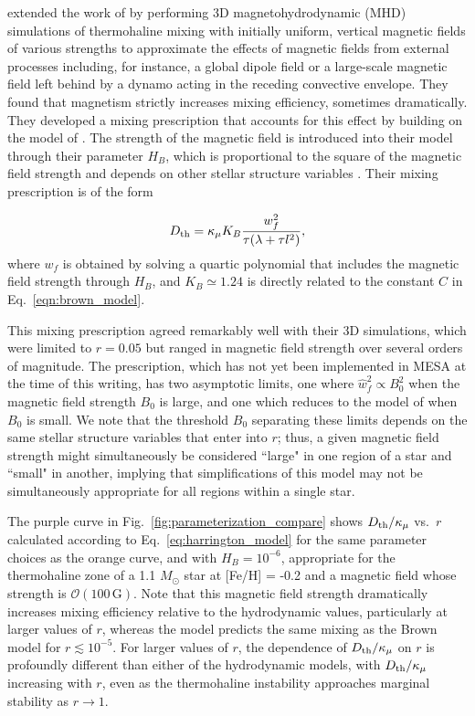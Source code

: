 \citet{harrington} extended the work of \citet{brown_etal_2013} by performing 3D magnetohydrodynamic (MHD) simulations of thermohaline mixing with initially uniform, vertical magnetic fields of various strengths to approximate the effects of magnetic fields from external processes including, for instance, a global dipole field or a large-scale magnetic field left behind by a dynamo acting in the receding convective envelope. 
They found that magnetism strictly increases mixing efficiency, sometimes dramatically.
They developed a mixing prescription that accounts for this effect by building on the model of \citet{brown_etal_2013}.
The strength of the magnetic field is introduced into their model through their parameter $H_B$, which is proportional to the square of the magnetic field strength and depends on other stellar structure variables \citep[see Eq.~19 of][]{harrington}.
Their mixing prescription is of the form

\begin{equation} \label{eq:harrington_model}
    \Dth = \kappa_{\mu}K_B\frac{w_f^2}{\tau (\lambda + \tau l^2)},
\end{equation}
where $w_f$ is obtained by solving a quartic polynomial that includes the magnetic field strength through $H_B$, and $K_B \simeq 1.24$ is directly related to the constant $C$ in Eq.~\eqref{eqn:brown_model}.

This mixing prescription agreed remarkably well with their 3D simulations, which were limited to $r = 0.05$ but ranged in magnetic field strength over several orders of magnitude.
The prescription, which has not yet been implemented in MESA at the time of this writing, has two asymptotic limits, one where $\hat{w}_f^2 \propto B_0^2$ when the magnetic field strength $B_0$ is large, and one which reduces to the model of \citet{brown_etal_2013} when $B_0$ is small. 
We note that the threshold $B_0$ separating these limits depends on the same stellar structure variables that enter into $r$; thus, a given magnetic field strength might simultaneously be considered ``large" in one region of a star and ``small" in another, implying that simplifications of this model may not be simultaneously appropriate for all regions within a single star.

The purple curve in Fig.~\ref{fig:parameterization_compare} shows $D_\mathrm{th}/\kappa_\mu$ vs.~$r$ calculated according to Eq.~\eqref{eq:harrington_model} for the same parameter choices as the orange curve, and with $H_B = 10^{-6}$, appropriate for the thermohaline zone of a 1.1 $M_\odot$ star at [Fe/H] = -0.2 and a magnetic field whose strength is $\mathcal{O}(100 \,\mathrm{G})$. 
Note that this magnetic field strength dramatically increases mixing efficiency relative to the hydrodynamic values, particularly at larger values of $r$, whereas the model predicts the same mixing as the Brown model for $r \lesssim 10^{-5}$. 
For larger values of $r$, the dependence of $D_\mathrm{th}/\kappa_\mu$ on $r$ is profoundly different than either of the hydrodynamic models, with $D_\mathrm{th}/\kappa_\mu$ increasing with $r$, even as the thermohaline instability approaches marginal stability as $r \to 1$.


